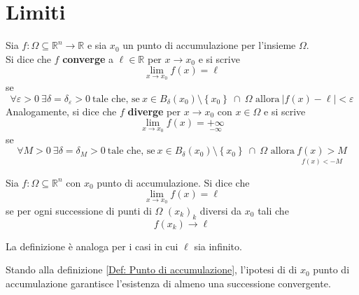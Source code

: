 \section{Limiti}
\begin{definition} \label{Def: Limiti al finito}
    Sia $f:\Omega \subseteq \mathbb{R}^n \to \mathbb{R}$ e sia $x_0$ un punto di accumulazione per l'insieme $\Omega$.\\
    Si dice che $f$ \textbf{converge} a $\ell \in \mathbb{R}$ per $x \to x_0$ e si scrive
    \begin{equation}
        \lim_{x \to x_0}{f(x)}=\ell
    \end{equation} 
    se
    \begin{equation}
        \forall \varepsilon>0 \ \exists\delta=\delta_\varepsilon>0\ \text{tale che, se}\ 
                x \in B_\delta(x_0) \setminus \left\{x_0\right\}\ \cap\ \Omega
            \text{ allora}\ |f(x)-\ell|<\varepsilon
    \end{equation}
    Analogamente, si dice che $f$ \textbf{diverge} per $x \to x_0$ con $x \in \Omega$ e si scrive
    \begin{equation}
        \lim_{x \to x_0}{f(x)}=\underset{-\infty}{+\infty}
    \end{equation}
    se 
    \begin{equation}
        \forall M>0 \ \exists\delta=\delta_M>0\ \text{tale che, se}\ 
        x \in B_\delta(x_0) \setminus \left\{x_0\right\}\ \cap\ \Omega
            \text{ allora}\ \underset{f(x)<-M}{f(x)>M}
    \end{equation}
\end{definition}
\begin{definition}
    Sia $f:\Omega \subseteq \mathbb{R}^n$ con $x_0$ punto di accumulazione. Si dice che 
    \begin{equation}
        \lim_{x \to x_0}{f(x)}=\ell
    \end{equation}
    se per ogni successione di punti di $\Omega$ $(x_k)_k$ diversi da $x_0$ tali che
    \begin{equation}
        f(x_k)\to \ell
    \end{equation}
    \begin{oss}
        La definizione è analoga per i casi in cui $\ell$ sia infinito.
    \end{oss}
    \begin{oss}
        Stando alla definizione \ref{Def: Punto di accumulazione}, l'ipotesi di di $x_0$ punto di accumulazione garantisce l'esistenza di almeno una successione convergente.
    \end{oss}
\end{definition}
